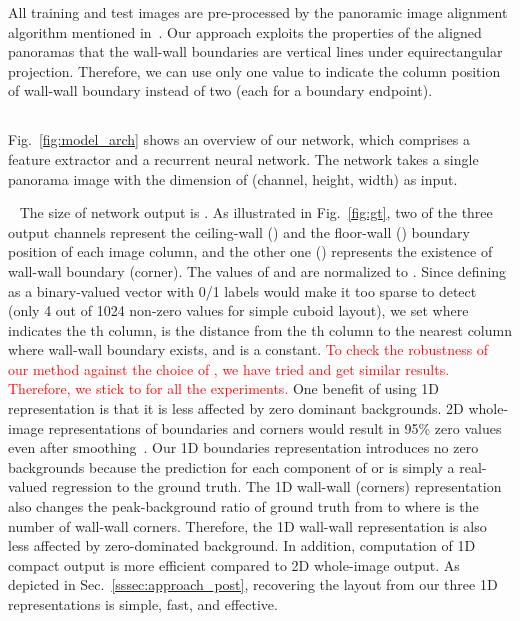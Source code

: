 \documentclass[10pt,twocolumn,letterpaper]{article}
\makeatletter
\renewcommand{\paragraph}{\@startsection{paragraph}{4}{\z@}{0\baselineskip \@plus 0ex \@minus 0ex}{-0em}{\normalfont\normalsize\bfseries}}
\newcommand{\revise}[1]{\textcolor{red}{#1}}
\newcommand{\revise}[1]{#1}
\makeatother
\begin{document}
All training and test images are pre-processed by the panoramic image alignment algorithm mentioned in~\cite{zou2018layoutnet}. Our approach exploits the properties of the aligned panoramas that the wall-wall boundaries are vertical lines under equirectangular projection. Therefore, we can use only one value to indicate the column position of wall-wall boundary instead of two (each for a boundary endpoint).


\subsection{\modelname} \label{sssec:approach_net}

Fig.~\ref{fig:model_arch} shows an overview of our network, which comprises a feature extractor and a recurrent neural network. The network takes a single panorama image with the dimension of  (channel, height, width) as input.

\paragraph{1D Layout Representation:} ~ The size of network output is .
As illustrated in Fig.~\ref{fig:gt}, two of the three output channels represent the ceiling-wall () and the floor-wall () boundary position of each image column, and the other one () represents the existence of wall-wall boundary (\ie corner). The values of  and  are normalized to .
Since defining  as a binary-valued vector with 0/1 labels would make it too sparse to detect (only 4 out of 1024 non-zero values for simple cuboid layout), we set  where  indicates the th column,  is the distance from the th column to the nearest column where wall-wall boundary exists, and  is a constant.
\revise{To check the robustness of our method against the choice of , we have tried  and get similar results. Therefore, we stick to  for all the experiments.}
One benefit of using 1D representation is that it is less affected by zero dominant backgrounds.
2D whole-image representations of boundaries and corners would result in 95\% zero values even after smoothing~\cite{zou2018layoutnet}.
Our 1D boundaries representation introduces no zero backgrounds because the prediction for each component of  or  is simply a real-valued regression to the ground truth.
The 1D wall-wall (corners) representation also changes the peak-background ratio of ground truth from  to  where  is the number of wall-wall corners.
Therefore, the 1D wall-wall representation is also less affected by zero-dominated background.
In addition, computation of 1D compact output is more efficient compared to 2D whole-image output.
As depicted in Sec.~\ref{sssec:approach_post}, recovering the layout from our three 1D representations is simple, fast, and effective.
\end{document}
